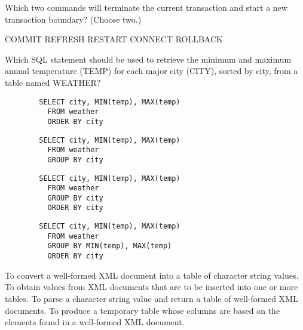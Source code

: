 \documentclass[answers, 11pt]{exam}
\begin{document}
\begin{questions}
\begin{solution}
\end{solution}
\question[1]
Which two commands will terminate the current transaction and start a new transaction boundary?
(Choose two.)
\begin{choices}
\CorrectChoice COMMIT
\choice REFRESH
\choice RESTART
\choice CONNECT
\CorrectChoice ROLLBACK
\end{choices}

\question[1]
Which SQL statement should be used to retrieve the minimum and maximum annual temperature (TEMP) for
each major city (CITY), sorted by city, from a table named WEATHER?
\begin{choices}
\choice \begin{verbatim}
		SELECT city, MIN(temp), MAX(temp)
		  FROM weather
		  ORDER BY city
		\end{verbatim}
\choice \begin{verbatim}
		SELECT city, MIN(temp), MAX(temp)
		  FROM weather
		  GROUP BY city
		\end{verbatim}
\CorrectChoice \begin{verbatim}
		SELECT city, MIN(temp), MAX(temp)
		  FROM weather
		  GROUP BY city
		  ORDER BY city
		\end{verbatim}
\choice \begin{verbatim}
		SELECT city, MIN(temp), MAX(temp)
		  FROM weather
		  GROUP BY MIN(temp), MAX(temp)
		  ORDER BY city
		\end{verbatim}
\end{choices}

\begin{choices}
\choice To convert a well-formed XML document into a table of character string values.
\CorrectChoice To obtain values from XML documents that are to be inserted into one or more tables.
\choice To parse a character string value and return a table of well-formed XML documents.
\choice To produce a temporary table whose columns are based on the elements found in a well-formed XML
document.
\end{choices}


\end{questions}
\end{document}
